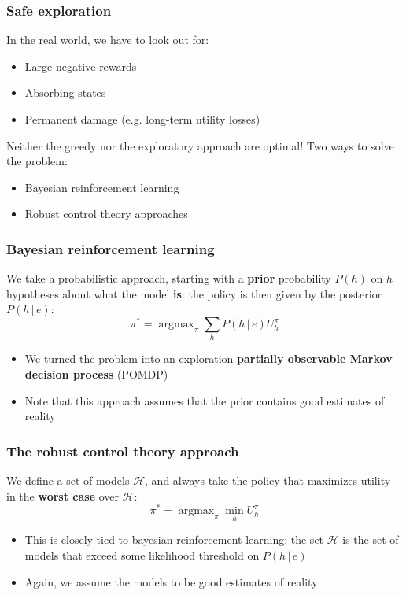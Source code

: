 \documentclass{beamer}
\DeclareMathOperator*{\argmax}{argmax}
\begin{document}
\begin{frame}
	\frametitle{Safe exploration}
	In the real world, we have to look out for:
	\begin{itemize}
		\item Large negative rewards
		\item Absorbing states 
		\item Permanent damage (e.g. long-term utility losses)
	\end{itemize}
	Neither the greedy nor the exploratory approach are optimal!
	\pause
	Two ways to solve the problem:
	\begin{itemize}
		\item Bayesian reinforcement learning
		\item Robust control theory approaches
	\end{itemize}
\end{frame}

\begin{frame}
	\frametitle{Bayesian reinforcement learning}
	We take a probabilistic approach, starting with a \textbf{prior} probability $P(h)$ on $h$ hypotheses about what the model \textbf{is}: the policy is then given by the posterior $P(h \, | \, e)$:
	$$
		\pi^* = \argmax_\pi \sum_h P(h \, | \, e) U_h^\pi
	$$
	\pause
	\begin{itemize}
		\item We turned the problem into an exploration \textbf{partially observable Markov decision process} (POMDP)
		\item Note that this approach assumes that the prior contains good estimates of reality
	\end{itemize}
\end{frame}

\begin{frame}
	\frametitle{The robust control theory approach}
	We define a set of models $\mathcal{H}$, and always take the policy that maximizes utility in the \textbf{worst case} over $\mathcal{H}$:
	$$
		\pi^* = \argmax_\pi \min_h U_h^\pi
	$$
	\pause
	\begin{itemize}
		\item This is closely tied to bayesian reinforcement learning: the set $\mathcal{H}$ is the set of models that exceed some likelihood threshold on $P(h \, | \, e)$
		\item Again, we assume the models to be good estimates of reality
	\end{itemize}
\end{frame}
\end{document}
